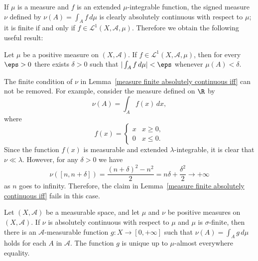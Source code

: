 If $\mu$ is a measure and $f$ is an extended $\mu$-integrable function, the signed measure $\nu$ defined by $\nu(A)=\int_Af\,d\mu$ is clearly absolutely continuous with respect to $\mu$; it is finite if and only if $f\in\mathcal{L}^1(X,\mathcal{A},\mu)$. Therefore we obtain the following useful result:
\begin{corollary}
Let $\mu$ be a positive measure on $(X,\mathcal{A})$. If $f\in\mathcal{L}^1(X,\mathcal{A},\mu)$, then for every $\eps>0$ there exists $\delta>0$ such that $|\int_Af\,d\mu|<\eps$ whenever $\mu(A)<\delta$.
\end{corollary}
\begin{example}
The finite condition of $\nu$ in Lemma~\ref{measure finite absolutely continuous iff} can not be removed. For example, consider the measure defined on $\R$ by
\[\nu(A)=\int_Af(x)\,dx,\]
where
\[f(x)=\begin{cases}
x&x\geq 0,\\
0&x\leq 0.
\end{cases}\]
Since the function $f(x)$ is measurable and extended $\lambda$-integrable, it is clear that $\nu\ll\lambda$. However, for any $\delta>0$ we have
\[\nu([n,n+\delta])=\frac{(n+\delta)^2-n^2}{2}=n\delta+\frac{\delta^2}{2}\to+\infty\]
as $n$ goes to infinity. Therefore, the claim in Lemma~\ref{measure finite absolutely continuous iff} fails in this case.
\end{example}
\begin{theorem}\label{Radon-Nikodym positive}
Let $(X,\mathcal{A})$ be a measurable space, and let $\mu$ and $\nu$ be positive measures on $(X,\mathcal{A})$. If $\nu$ is absolutely continuous with respect to $\mu$ and $\mu$ is $\sigma$-finite, then there is an $\mathcal{A}$-measurable function $g:X\to[0,+\infty]$ such that $\nu(A)=\int_Ag\,d\mu$ holds for each $A$ in $\mathcal{A}$. The function $g$ is unique up to $\mu$-almost everywhere equality.
\end{theorem}
